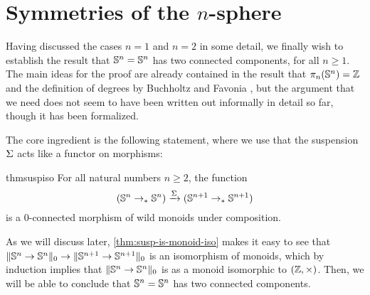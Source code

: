 \documentclass[english,a4paper]{lmcs}
\begin{document}
\section{Symmetries of the \texorpdfstring{$n$}{n}-sphere}
\label{sec:higher-sphere}



Having discussed the cases $n = 1$ and $n = 2$ in some detail, we finally wish to establish the result that ${\mathbb S^{n}} = {\mathbb S^{n}}$ has two connected components, for all $n \geq 1$.
The main ideas for the proof are already contained in the result that $\pi_n({\mathbb S^{n}}) = \mathbb{Z}$ \cite{licataBrunerie_s1again} and the definition of degrees by Buchholtz and Favonia \cite{Buchholtz2018CellularCI}, but the argument that we need does not seem to have been written out
informally in detail so far, though it has been formalized.

The core ingredient is the following statement,
where we use that the suspension $\operatorname{\Sigma}$ acts like a functor on morphisms:
\begin{restatable}{thm}{suspiso}
    \label{thm:susp-is-monoid-iso}
    For all natural numbers $n \geq 2$, the function
    \begin{equation} \label{eq:susp-monoid-morphism}
    ({\mathbb S^{n}} \to_* {\mathbb S^{n}}) \xrightarrow{\operatorname{\Sigma}} ({\mathbb S^{n+1}} \to_* {\mathbb S^{n+1}})
    \end{equation}
    is a $0$-connected morphism of wild monoids under composition.
\end{restatable}

As we will discuss later, \cref{thm:susp-is-monoid-iso} makes it easy to see
that $\lVert{\mathbb S^{n}} \to {\mathbb S^{n}}\rVert_0 \to \lVert{\mathbb S^{n+1}} \to {\mathbb S^{n+1}}\rVert_0$ is
an isomorphism of monoids, which by induction implies that $\lVert{\mathbb S^{n}}
\to {\mathbb S^{n}}\rVert_0$ is as a monoid isomorphic to $(\mathbb{Z}, \times)$. Then, we will be able
to conclude that ${\mathbb S^{n}} = {\mathbb S^{n}}$ has two connected components.
\end{document}
